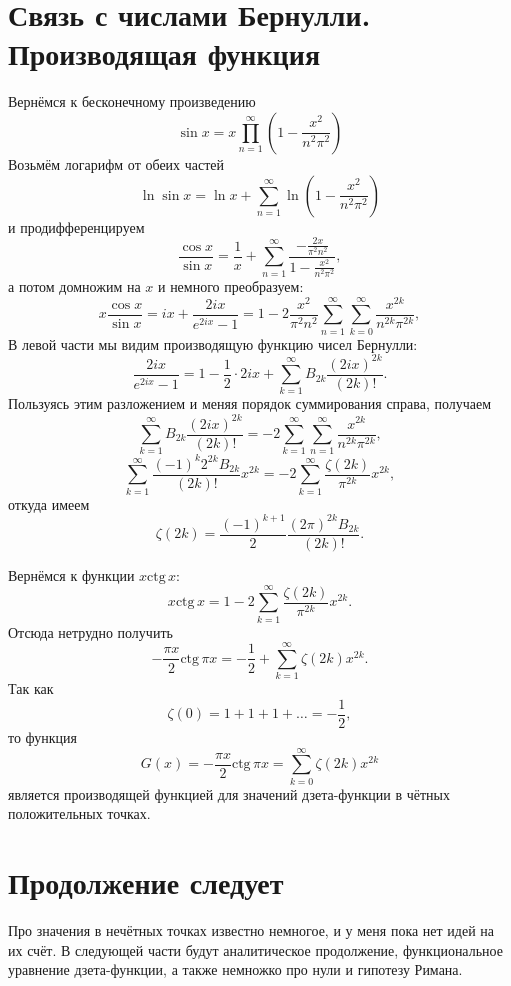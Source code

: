 \section{Связь с числами Бернулли. Производящая функция}
Вернёмся к бесконечному произведению
\[
    \sin x = x\prod\limits_{n=1}^\infty\left(1-\frac{x^2}{n^2\pi^2}\right)
\]
Возьмём логарифм от обеих частей
\[
    \ln\sin x = \ln x + \sum\limits_{n=1}^\infty \ln\left(1-\frac{x^2}{n^2\pi^2}\right)
\]
и продифференцируем
\[
    \frac{\cos x}{\sin x} = \frac{1}{x} + \sum\limits_{n=1}^\infty \frac{-\frac{2 x}{\pi^2 n^2}}{1-\frac{x^2}{n^2\pi^2}},
\]
а потом домножим на \( x \) и немного преобразуем:
\[
     x\frac{\cos x}{\sin x} = ix + \frac{2ix}{e^{2ix}-1} = 1 -2\frac{x^2}{\pi^2 n^2}\sum\limits_{n=1}^\infty\sum\limits_{k=0}^\infty \frac{x^{2k}}{n^{2k}\pi^{2k}},
\]
В левой части мы видим производящую функцию чисел Бернулли:
\[
    \frac{2ix}{e^{2ix}-1} = 1 - \frac{1}{2}\cdot 2ix + \sum\limits_{k=1}^\infty B_{2k}\frac{(2ix)^{2k}}{(2k)!}.
\]
Пользуясь этим разложением и меняя порядок суммирования справа, получаем
\[
      \sum\limits_{k=1}^\infty B_{2k}\frac{(2ix)^{2k}}{(2k)!}= -2\sum\limits_{k=1}^\infty\sum\limits_{n=1}^\infty \frac{x^{2k}}{n^{2k}\pi^{2k}},
\]
\[
      \sum\limits_{k=1}^\infty \frac{(-1)^k2^{2k}B_{2k}}{(2k)!}x^{2k}= -2\sum\limits_{k=1}^\infty \frac{\zeta(2k)}{\pi^{2k}}x^{2k},
\]
откуда имеем
\[
    \zeta(2k) = \frac{(-1)^{k+1}}{2}\frac{(2\pi)^{2k}B_{2k}}{(2k)!}.
\]

Вернёмся к функции \( x\mathrm{ctg\,} x \):
\[
    x\mathrm{ctg\,} x = 1 - 2\sum\limits_{k=1}^\infty \frac{\zeta(2k)}{\pi^{2k}}x^{2k}.
\]
Отсюда нетрудно получить
\[
    -\frac{\pi x}{2}\mathrm{ctg\,}\pi x = -\frac{1}{2} + \sum\limits_{k=1}^\infty \zeta(2k)x^{2k}.
\]
Так как 
\[
    \zeta(0) = 1 + 1 + 1 + \ldots = -\frac{1}{2},
\]
то функция
\[
    G(x) = -\frac{\pi x}{2}\mathrm{ctg\,}\pi x = \sum\limits_{k=0}^\infty \zeta(2k)x^{2k}
\]
является производящей функцией для значений дзета-функции в чётных положительных точках.

\section{Продолжение следует}

Про значения в нечётных точках известно немногое, и у меня пока нет идей на их счёт. В следующей части будут аналитическое продолжение, функциональное уравнение дзета-функции, а также немножко про нули и гипотезу Римана.
